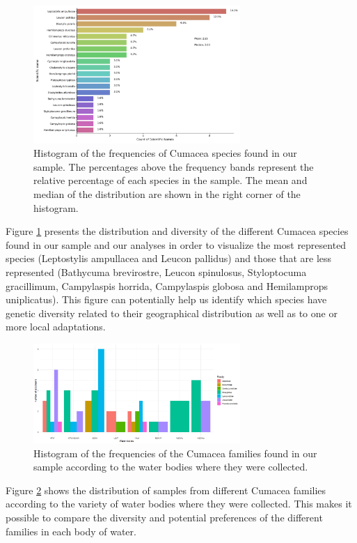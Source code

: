 \begin{figure}[]
    \centering
    \includegraphics[width=0.7\textwidth]{figure2.jpg}
    \caption{Histogram of the frequencies of Cumacea species found in our sample. The percentages above the frequency bands represent the relative percentage of each species in the sample. The mean and median of the distribution are shown in the right corner of the histogram. \label{fig:fig2}}
\end{figure}

Figure \ref{fig:fig2} presents the distribution and diversity of the different Cumacea species found in our sample and our analyses in order to visualize the most represented species (Leptostylis ampullacea and Leucon pallidus) and those that are less represented (Bathycuma brevirostre, Leucon spinulosus, Styloptocuma gracillimum, Campylaspis horrida, Campylaspis globosa and Hemilamprops uniplicatus). This figure can potentially help us identify which species have genetic diversity related to their geographical distribution as well as to one or more local adaptations.

\begin{figure}[]
    \centering
    \includegraphics[width=0.7\textwidth]{figure3.png}
    \caption{Histogram of the frequencies of the Cumacea families found in our sample according to the water bodies where they were collected. \label{fig:fig3}}
\end{figure}

Figure \ref{fig:fig3} shows the distribution of samples from different Cumacea families according to the variety of water bodies where they were collected. This makes it possible to compare the diversity and potential preferences of the different families in each body of water. 

